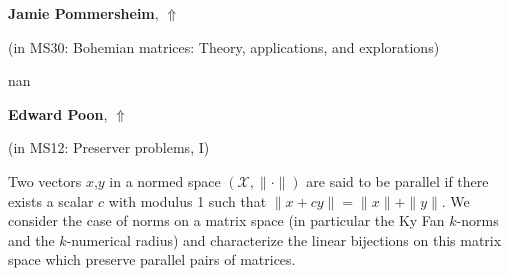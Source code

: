 \documentclass[ILAS2025-program.tex]{subfiles}
\begin{document}
     \hypertarget{down0229}{}\begin{ilasabstract}
    
    \textbf{Jamie Pommersheim},  \hfill \hyperlink{up0229}{$\Uparrow$}
    
    (in {\color{mstitle}MS30: Bohemian matrices: Theory, applications, and explorations})
        
        \mtskip
    nan\end{ilasabstract}
     \hypertarget{down0017}{}\begin{ilasabstract}
    
    \textbf{Edward Poon},  \hfill \hyperlink{up0017}{$\Uparrow$}
    
    (in {\color{mstitle}MS12: Preserver problems, I})
        
        \mtskip
    Two vectors $x$,$y$ in a normed space $(\mathcal{X}, \| \cdot \|)$ are said to be parallel if there exists a scalar $c$ with modulus 1 such that $\|x+c y\| = \|x\| + \|y\|$.
We consider the case of norms on a matrix space (in particular the Ky Fan $k$-norms and the $k$-numerical radius) and characterize the linear bijections on this matrix space which preserve parallel pairs of matrices.
\end{ilasabstract}
\end{document}
